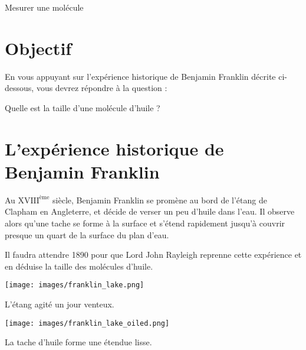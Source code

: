 \documentclass[12pt,a4paper]{article}
\begin{document}
\begin{header}
Mesurer une molécule
\end{header}

\section*{Objectif}

En vous appuyant sur l'expérience historique de Benjamin Franklin décrite ci-dessous, vous devrez répondre à la question :

\begin{objectif}
Quelle est la taille d'une molécule d'huile ?
\end{objectif}

\section*{L'expérience historique de Benjamin Franklin}

Au $\text{XVIII}^\text{ème}$ siècle, Benjamin Franklin se promène au bord de l'étang de Clapham en Angleterre, et décide de verser un peu d'huile dans l'eau. Il observe alors qu'une tache se forme à la surface et s'étend rapidement jusqu'à couvrir presque un quart de la surface du plan d'eau.

Il faudra attendre 1890 pour que Lord John Rayleigh reprenne cette expérience et en déduise la taille des molécules d'huile.

\begin{multicols}{2}
\center
\texttt{[image: images/franklin\_lake.png]}

L'étang agité un jour venteux.

\texttt{[image: images/franklin\_lake\_oiled.png]}

La tache d'huile forme une étendue lisse.
\end{multicols}
\end{document}

